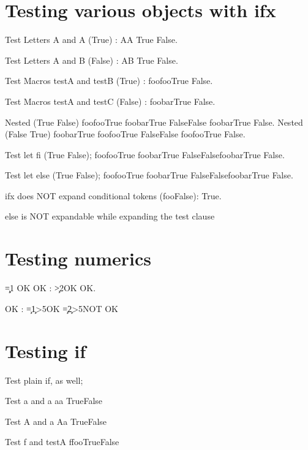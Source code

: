 \documentclass{article}
\begin{document}
\section{Testing various objects with ifx}
\def\testA{foo}
\def\testB{foo}
\def\testC{bar}

Test Letters A and A (True) : \ifx AA True \else False\fi.

Test Letters A and B (False) : \ifx AB True \else False\fi.

Test Macros testA and testB (True) : \ifx\testA\testB True \else False\fi.

Test Macros testA and testC (False) : \ifx\testA\testC True \else False\fi.

Nested (True False)
\ifx\testA\testB True \ifx\testA\testC True \else False\fi \else False \ifx\testA\testC True \else False\fi\fi.
Nested (False True)
\ifx\testA\testC True \ifx\testA\testB True \else False\fi \else False \ifx\testA\testB True \else False\fi\fi.

\let\endif\fi
Test let fi (True False); 
\ifx\testA\testB True \ifx\testA\testC True \else False\endif \else False\ifx\testA\testC True \else False\endif\endif.

\let\otherwise\else
Test let else (True False); 
\ifx\testA\testB True \ifx\testA\testC True \otherwise False\endif \otherwise False\ifx\testA\testC True \otherwise False\endif\endif.


ifx does NOT expand conditional tokens (fooFalse): \ifx\iftrue\testA True\else\testB False\fi.

else is NOT expandable while expanding the test clause

\section{Testing numerics}
\newcount\c\c=1
OK OK :
\ifnum\c>2\else OK \fi
{}\else OK\fi.

\def\oneorten{1\ifodd\c{}\fi}
OK :
\c=1\relax\ifnum\oneorten>5\else OK \fi
\c=2\relax\ifnum\oneorten>5\else NOT OK\fi


\section{Testing if}
Test plain if, as well;

Test a and a \if aa True\else False\fi

Test A and a \if Aa True\else False\fi

Test f and testA \if f\testA True\else False\fi
\end{document}

